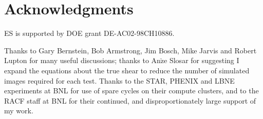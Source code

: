 \documentclass[usegraphicx,usenatbib]{mn2e}
\begin{document}
\section*{Acknowledgments}

ES is supported by DOE grant DE-AC02-98CH10886.

Thanks to Gary Bernstein, Bob Armstrong, Jim Bosch, Mike Jarvis and Robert
Lupton for many useful discussions; thanks to An$\check{\textrm{z}}$e Slosar for
suggesting I expand the equations about the true shear to reduce the number of
simulated images required for each test.  Thanks to the STAR, PHENIX and LBNE
experiments at BNL for use of spare cycles on their compute clusters, and to
the RACF staff at BNL for their continued, and disproportionately large support
of my work.




\end{document}
